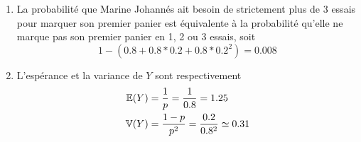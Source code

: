 {\begin{td-sol}[]
\begin{enumerate}
\begin{enumerate}
                \item La probabilité que Marine Johannés ait besoin de
                strictement plus de 3 essais pour marquer son premier
                panier est équivalente à la probabilité qu'elle ne marque
                pas son premier panier en 1, 2 ou 3 essais, soit
                \begin{equation*}
                    1 - \left(0.8 + 0.8*0.2 + 0.8*{0.2}^2\right)=0.008
                \end{equation*}

                \item L'espérance et la variance de \(Y\) sont respectivement
                \begin{equation*}
                    \begin{aligned}
                        \mathbb{E}(Y) &= \frac 1{p} = \frac 1{0.8} = 1.25\\
                        \mathbb{V}(Y) &= \frac {1-p}{p^2} = \frac {0.2}{0.8^2} \simeq 0.31
                    \end{aligned}
                \end{equation*}
            \end{enumerate}
        \end{enumerate}
    \end{td-sol}
}{}

